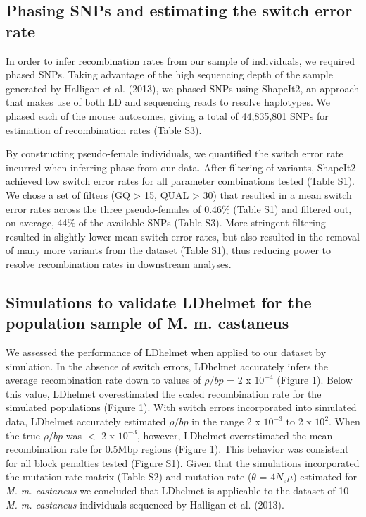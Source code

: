 \subsection{Phasing SNPs and estimating the switch error rate}
 
In order to infer recombination rates from our sample of individuals, we required phased SNPs. Taking advantage of the high sequencing depth of the sample generated by Halligan et al. (2013), we phased SNPs using ShapeIt2, an approach that makes use of both LD and sequencing reads to resolve haplotypes. We phased each of the mouse autosomes, giving a total of 44,835,801 SNPs for estimation of recombination rates (Table S3). 
 
By constructing pseudo-female individuals, we quantified the switch error rate incurred when inferring phase from our data. After filtering of variants, ShapeIt2 achieved low switch error rates for all parameter combinations tested (Table S1). We chose a set of filters (GQ > 15, QUAL > 30) that resulted in a mean switch error rates across the three pseudo-females of 0.46\% (Table S1) and filtered out, on average, 44\% of the available SNPs (Table S3). More stringent filtering resulted in slightly lower mean switch error rates, but also resulted in the removal of many more variants from the dataset (Table S1), thus reducing power to resolve recombination rates in downstream analyses.
 
\subsection{Simulations to validate LDhelmet for the population sample of M. m. castaneus}
 
We assessed the performance of LDhelmet when applied to our dataset by simulation. In the absence of switch errors, LDhelmet accurately infers the average recombination rate down to values of $\rho/bp$ = 2 x $10^{-4}$ (Figure 1). Below this value, LDhelmet overestimated the scaled recombination rate for the simulated populations (Figure 1). With switch errors incorporated into simulated data, LDhelmet accurately estimated $\rho/bp$ in the range 2 x $10^{-3}$ to 2 x $10^{2}$. When the true $\rho/bp$ was $<$ 2 x $10^{-3}$, however, LDhelmet overestimated the mean recombination rate for 0.5Mbp regions (Figure 1). This behavior was consistent for all block penalties tested (Figure S1). Given that the simulations incorporated the mutation rate matrix (Table S2) and mutation rate ($\theta$ = $4N_{e}\mu$) estimated for \emph{M. m. castaneus} we concluded that LDhelmet is applicable to the dataset of 10 \emph{M. m. castaneus} individuals sequenced by Halligan et al. (2013).
 
